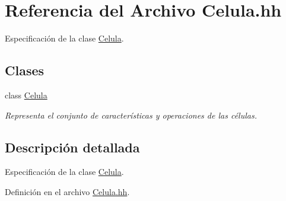 \hypertarget{_celula_8hh}{\section{\-Referencia del \-Archivo \-Celula.\-hh}
\label{_celula_8hh}
}


\-Especificación de la clase \hyperlink{class_celula}{\-Celula}.  


\subsection*{\-Clases}
\begin{DoxyCompactItemize}
\item 
class \hyperlink{class_celula}{\-Celula}
\begin{DoxyCompactList}\small\item\em \-Representa el conjunto de características y operaciones de las células. \end{DoxyCompactList}\end{DoxyCompactItemize}


\subsection{\-Descripción detallada}
\-Especificación de la clase \hyperlink{class_celula}{\-Celula}. 

\-Definición en el archivo \hyperlink{_celula_8hh_source}{\-Celula.\-hh}.

